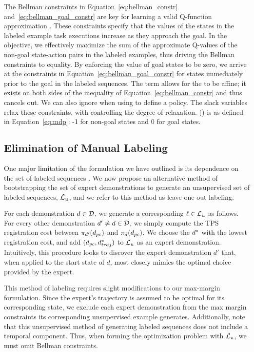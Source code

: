 The Bellman constraints in Equation~\ref{eq:bellman_constr} and~\ref{eq:bellman_goal_constr}
are key for learning a valid Q-function approximation \approxq. These constraints specify that
the values of the states in the labeled example task executions increase as they
approach the goal. In the objective, we effectively maximize the sum of the
approximate Q-values of the non-goal state-action pairs in the labeled examples,
thus driving the Bellman constraints to equality. By enforcing the value of goal states
to be zero, we arrive at the constraints in Equation~\ref{eq:bellman_goal_constr} for
states immediately prior to the goal in the labeled sequences.
The \weightszero{} term allows for the \approxq{} to be affine; it exists on
both sides of the inequality of Equation~\ref{eq:bellman_constr} and thus cancels out.
We can also ignore \weightszero{} when using \approxq{} to define a policy. The slack variables
 relax these constraints, with \bellmanslackc{} controlling
the degree of relaxation.
\rewardfn{}(\statevar{}) is as defined in Equation~\ref{eq:mdp}:
-1 for non-goal states and 0 for goal states.

\subsection{Elimination of Manual Labeling}
\label{subsec:lool}
One major limitation of the formulation we have outlined is its dependence on
the set of labeled sequences . We now propose an alternative method
of bootstrapping the set of expert demonstrations \demoset{} to generate an
unsupervised set of labeled sequences, $\mathcal{L}{}_u$, and we refer to this
method as leave-one-out labeling.

For each demonstration $d{} \in \mathcal{D}{}$, we generate a corresponding
$\ell \in \mathcal{L}_u$ as follows. For every other demonstration
$d{}' \neq d{} \in \mathcal{D}{}$, we simply compute the TPS
registration cost between $\pi_{d{}'}(d_{pc})$ and
$\pi_{d{}}(d{}_{pc})$. We choose the $d{}^*$ with the
lowest registration cost, and add $(d{}_{pc}, d{}^*_{traj})$ to
$\mathcal{L}{}_u$ as an expert demonstration. Intuitively, this procedure looks to
discover the expert demonstration $d'$ that, when applied to the start state of
$d$, most closely mimics the optimal choice provided by the expert.

This method of labeling requires slight modifications to our max-margin
formulation. Since the expert's trajectory is assumed to be optimal for its
corresponding state, we exclude each expert demonstration from the max margin
constraints its corresponding unsupervised example generates. Additionally, note
that this unsupervised method of generating labeled sequences does not include a
temporal component. Thus, when forming the optimization problem with
$\mathcal{L}{}_u$, we must omit Bellman constraints.
